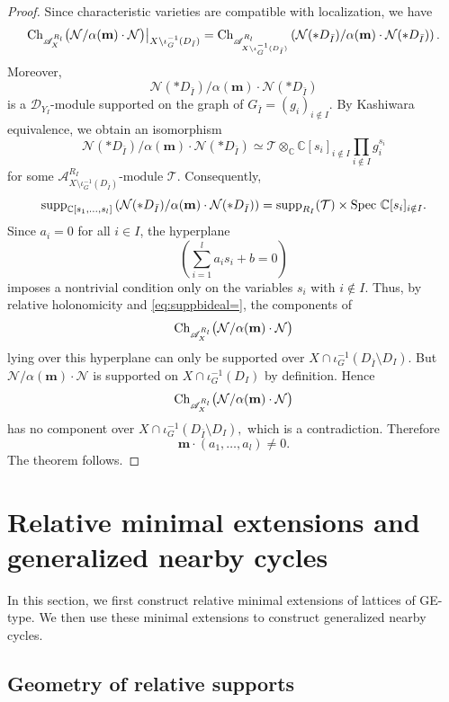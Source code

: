 \documentclass{amsart}
\theoremstyle{plain}
\numberwithin{theorem}{section}
\theoremstyle{definition}
\theoremstyle{remark}
\theoremstyle{definition}
\newcommand{\C}{\mathbb{C}} %
\newcommand{\Z}{\mathbb{Z}}
\newcommand{\cL}{\mathcal{L}}
\newcommand{\cM}{\mathcal{M}}
\newcommand{\cN}{\mathcal{N}}
\newcommand{\cT}{\mathcal{T}}
\newcommand{\bm}{\mathbf{m}}
\newcommand{\sA}{\mathscr{A}}
\newcommand{\shD}{\mathscr{D}}
\newcommand{\Spec}{\textup{Spec }}
\newcommand{\supp}{\textup{supp}}
\newcommand{\Ch}{\textup{Ch}}
\begin{document}
\begin{proof}
Since characteristic varieties are compatible with localization, we have
\[
\Ch_{\sA_X^{R_l}}
\big(\cN/\alpha(\bm)\cdot\cN\big)
\big|_{X\setminus \iota_G^{-1}(D_{\bar I})}
=
\Ch_{\sA_{X\setminus \iota_G^{-1}(D_{\bar I})}^{R_l}}
\left(
\cN(*D_{\bar I})/
\alpha(\bm)\cdot\cN(*D_{\bar I})
\right).
\]
Moreover,
\[
\cN(*D_{\bar I})/
\alpha(\bm)\cdot\cN(*D_{\bar I})
\]
is a $\shD_{Y_I}$-module supported on the graph of
$G_{\bar I}=(g_i)_{i\notin I}.$
By Kashiwara equivalence, we obtain an isomorphism
\[
\cN(*D_{\bar I})/
\alpha(\bm)\cdot\cN(*D_{\bar I})
\simeq
\cT\otimes_\C \C[s_i]_{i\notin I}
\prod_{i\notin I}g_i^{s_i}
\]
for some
$\sA^{R_I}_{X\setminus \iota_G^{-1}(D_{\bar I})}
\text{-module } \cT.$
Consequently,
\[
\supp_{\C[s_1,\dots,s_l]}
\left(
\cN(*D_{\bar I})/
\alpha(\bm)\cdot\cN(*D_{\bar I})
\right)
=
\supp_{R_I}(\cT)\times \Spec \C[s_i]_{i\notin I}.
\]
Since $a_i=0$ for all $i\in I$, the hyperplane
\[
\left(\sum_{i=1}^l a_i s_i+b=0\right)
\]
imposes a nontrivial condition only on the variables $s_i$ with $i\notin I$.
Thus, by relative holonomicity and \eqref{eq:suppbideal=}, the components of
\[
\Ch_{\sA_X^{R_l}}\big(\cN/\alpha(\bm)\cdot\cN\big)
\]
lying over this hyperplane can only be supported over
$X\cap \iota_G^{-1}(D_{\bar I}\setminus D_I).$
But
$\cN/\alpha(\bm)\cdot\cN$
is supported on
$X\cap \iota_G^{-1}(D_I)$
by definition. Hence
\[
\Ch_{\sA_X^{R_l}}\big(\cN/\alpha(\bm)\cdot\cN\big)
\]
has no component over
$X\cap \iota_G^{-1}(D_{\bar I}\setminus D_I),$
which is a contradiction. Therefore
\[
\bm\cdot(a_1,\dots,a_l)\neq 0.
\]
The theorem follows.
\end{proof}


\section{Relative minimal extensions and generalized nearby cycles}
\label{sect:rmegnc}

In this section, we first construct relative minimal extensions of lattices of GE-type. We then use these minimal extensions to construct generalized nearby cycles.

\subsection{Geometry of relative supports}
\end{document}
